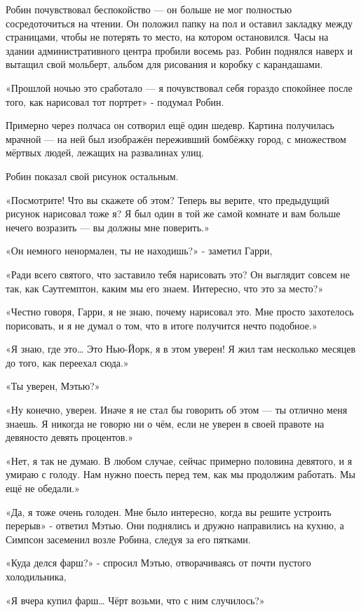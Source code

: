 \documentclass[a5paper, 9pt,
final, openany, twoside=true]{memoir}
\begin{document}
Робин почувствовал беспокойство — он больше не мог полностью сосредоточиться на чтении. Он положил папку на пол и оставил закладку между страницами, чтобы не потерять то место, на котором остановился. Часы на здании административного центра пробили восемь раз. Робин поднялся наверх и вытащил свой мольберт, альбом для рисования и коробку с карандашами.

«Прошлой ночью это сработало — я почувствовал себя гораздо спокойнее после того, как нарисовал тот портрет» - подумал Робин.

Примерно через полчаса он сотворил ещё один шедевр. Картина получилась мрачной — на ней был изображён переживший бомбёжку город, с множеством мёртвых людей, лежащих на развалинах улиц.\bigskip

Робин показал свой рисунок остальным.

«Посмотрите! Что вы скажете об этом? Теперь вы верите, что предыдущий рисунок нарисовал тоже я? Я был один в той же самой комнате и вам больше нечего возразить — вы должны мне поверить.»

«Он немного ненормален, ты не находишь?» - заметил Гарри,

«Ради всего святого, что заставило тебя нарисовать это? Он выглядит совсем не так, как Саутгемптон, каким мы его знаем. Интересно, что это за место?»

«Честно говоря, Гарри, я не знаю, почему нарисовал это. Мне просто захотелось порисовать, и я не думал о том, что в итоге получится нечто подобное.»

«Я знаю, где это… Это Нью-Йорк, я в этом уверен! Я жил там несколько месяцев до того, как переехал сюда.»

«Ты уверен, Мэтью?»

«Ну конечно, уверен. Иначе я не стал бы говорить об этом — ты отлично меня знаешь. Я никогда не говорю ни о чём, если не уверен в своей правоте на девяносто девять процентов.»

«Нет, я так не думаю. В любом случае, сейчас примерно половина девятого, и я умираю с голоду. Нам нужно поесть перед тем, как мы продолжим работать. Мы ещё не обедали.»

«Да, я тоже очень голоден. Мне было интересно, когда вы решите устроить перерыв» - ответил Мэтью. Они поднялись и дружно направились на кухню, а Симпсон засеменил возле Робина, следуя за его пятками.

«Куда делся фарш?» - спросил Мэтью, отворачиваясь от почти пустого холодильника,

«Я вчера купил фарш… Чёрт возьми, что с ним случилось?»
\end{document}
